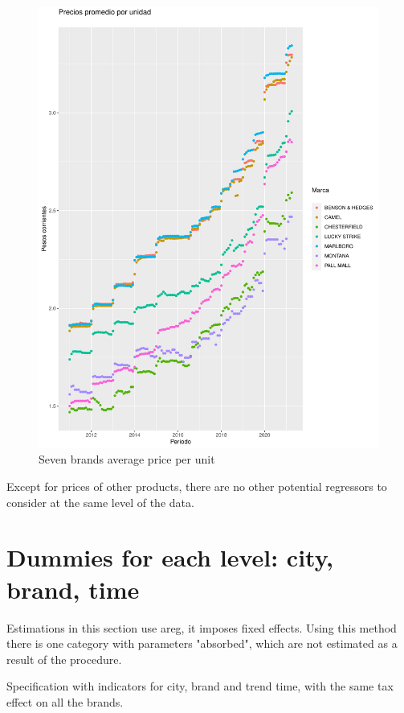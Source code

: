 \documentclass[]{article}
\begin{document}
\begin{figure}
\begin{center}
		\includegraphics[width=\textwidth]{prin7_prom_ppu_marcas.pdf} 
\end{center}
 \caption{Seven brands average price per unit}
\end{figure}

Except for prices of other products, there are no other potential regressors to consider at the same level of the data.

\section{Dummies for each level: city, brand, time}
Estimations in this section use areg, it imposes fixed effects. Using  this method there is one category with parameters "absorbed", which are not estimated as a result of the procedure.

Specification with indicators for city, brand and trend time, with the same tax effect on all the brands.
\end{document}
